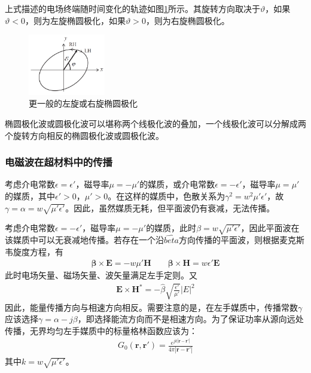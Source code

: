 \documentclass{article}
\numberwithin{equation}{section}
\renewcommand{\vec}[1]{\boldsymbol{#1}}
\begin{document}
上式描述的电场终端随时间变化的轨迹如图\ref{fig:fig41}所示。其旋转方向取决于$\vartheta$，如果$\vartheta<0$，则为左旋椭圆极化，如果$\vartheta>0$，则为右旋椭圆极化。
\begin{figure}[ht]
    \centering
    \includegraphics[width=0.3\textwidth]{更一般的左旋或右旋椭圆极化.PNG}
    \caption{更一般的左旋或右旋椭圆极化}
    \label{fig:fig41}
\end{figure}
\par
椭圆极化波或圆极化波可以堪称两个线极化波的叠加，一个线极化波可以分解成两个旋转方向相反的椭圆极化波或圆极化波。
\subsubsection{电磁波在超材料中的传播}
考虑介电常数$\epsilon=\epsilon'$，磁导率$\mu=-\mu'$的媒质，或介电常数$\epsilon=-\epsilon'$，磁导率$\mu=\mu'$的媒质，其中$\epsilon'>0$，$\mu'>0$。在这样的媒质中，色散关系为$\gamma^2=w^2\mu'\epsilon'$，故$\gamma=\alpha=w\sqrt{\mu'\epsilon'}$。因此，虽然媒质无耗，但平面波仍有衰减，无法传播。\par
考虑介电常数$\epsilon=-\epsilon'$，磁导率$\mu=-\mu'$的媒质，此时$\beta=w\sqrt{\mu'\epsilon'}$，因此平面波在该媒质中可以无衰减地传播。若存在一个沿$\hat{beta}$方向传播的平面波，则根据麦克斯韦旋度方程，有
\begin{align}
    \label{eq:eq368}
    \vec{\beta}\times\mathbf{E}=-w\mu'\mathbf{H}\qquad\vec{\beta}\times\mathbf{H}=w\epsilon'\mathbf{E}
\end{align}
此时电场矢量、磁场矢量、波矢量满足左手定则。又
\begin{align}
    \label{eq:eq369}
    \mathbf{E}\times\mathbf{H}^*=-\hat{\beta}\sqrt{\frac{\epsilon'}{\mu'}}|E|^2
\end{align}
因此，能量传播方向与相速方向相反。需要注意的是，在左手媒质中，传播常数$\gamma$应该选择$\gamma=\alpha-j\beta$，即选择能流方向而不是相速方向。为了保证功率从源向远处传播，无界均匀左手媒质中的标量格林函数应该为：
\begin{align}
    \label{eq:eq370}
    G_0(\vec{r},\vec{r}')=\frac{e^{jk|\vec{r}-\vec{r}'|}}{4\pi |\vec{r}-\vec{r}'|}
\end{align}
其中$k=w\sqrt{\mu'\epsilon'}$。
\end{document}
